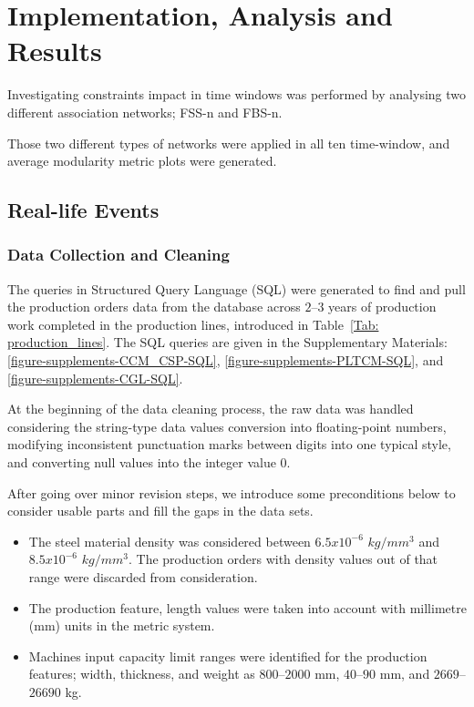 \chapter{Implementation, Analysis and Results}
{\color{red} 
	Investigating constraints impact in time windows was performed by analysing two different association networks; FSS-n and FBS-n.
	
	Those two different types of networks were applied in all ten time-window, and average modularity metric plots were generated. 
}

\section{Real-life Events}
\subsection*{Data Collection and Cleaning}
%

The queries in Structured Query Language (SQL) were generated to find and pull the production orders data from the database across $2$--$3$ years of production work completed in the production lines, {\color{red}introduced in Table~\ref{Tab: production_lines}}. The SQL queries are given in the Supplementary Materials: \ref{figure-supplements-CCM_CSP-SQL}, \ref{figure-supplements-PLTCM-SQL}, and \ref{figure-supplements-CGL-SQL}.

At the beginning of the data cleaning process, the raw data was handled considering the string-type data values conversion into floating-point numbers, modifying inconsistent punctuation marks between digits into one typical style, and converting null values into the integer value $0$. 

After going over minor revision steps, we introduce some preconditions below to consider usable parts and fill the gaps in the data sets.
\begin{itemize}
	\item The steel material density was considered between $6.5 x 10^{-6}$ $kg/mm^{3}$ and $8.5 x 10^{-6}$ $kg/mm^{3}$. The production orders with density values out of that range were discarded from consideration.
	\item The production feature, length values were taken into account with millimetre (mm) units in the metric system.
	\item Machines input capacity limit ranges were identified for the production features; width, thickness, and weight as $800$--$2000$ mm, $40$--$90$ mm, and $2669$--$26690$ kg.
\end{itemize}


